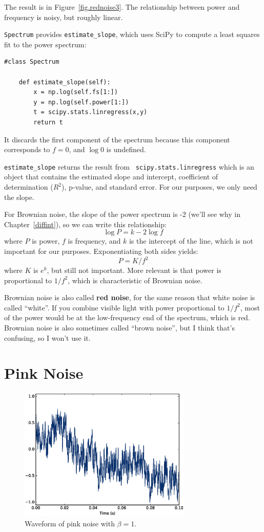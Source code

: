 \documentclass[12pt]{book}
\begin{document}
The result is in Figure~\ref{fig.rednoise3}.  The relationship between
power and frequency is noisy, but roughly linear.

{\tt Spectrum} provides \verb"estimate_slope", which uses SciPy to compute
a least squares fit to the power spectrum:

\begin{verbatim}
#class Spectrum

    def estimate_slope(self):
        x = np.log(self.fs[1:])
        y = np.log(self.power[1:])
        t = scipy.stats.linregress(x,y)
        return t
\end{verbatim}

It discards the first component of the spectrum because
this component corresponds to $f=0$, and $\log 0$ is undefined.

\verb"estimate_slope" returns the result from {\tt
  scipy.stats.linregress} which is an object that contains the
estimated slope and intercept, coefficient of determination ($R^2$),
p-value, and standard error.  For our purposes, we only need the
slope.

For Brownian noise, the slope of the power spectrum is -2 (we'll see
why in Chapter~\ref{diffint}), so we can write this relationship:
%
\[ \log P = k -2 \log f \]
%
where $P$ is power, $f$ is frequency, and $k$ is the intercept
of the line, which is not important for our purposes.
Exponentiating both sides yields:
%
\[ P = K / f^{2} \]
%
where $K$ is $e^k$, but still not important.  More relevant is
that power is proportional to $1/f^2$, which is characteristic
of Brownian noise.

Brownian noise is also called {\bf red noise}, for the same reason that
white noise is called ``white''.  If you combine visible light with
power proportional to $1/f^2$, most of the power
would be at the low-frequency end of the spectrum, which is red.
Brownian noise is also sometimes called ``brown noise'', but I think
that's confusing, so I won't use it.



\section{Pink Noise}
\label{pink}

\begin{figure}
\centerline{\includegraphics[height=2.5in]{figs/pinknoise0.eps}}
\caption{Waveform of pink noise with $\beta=1$.}
\label{fig.pinknoise0}
\end{figure}
\end{document}
